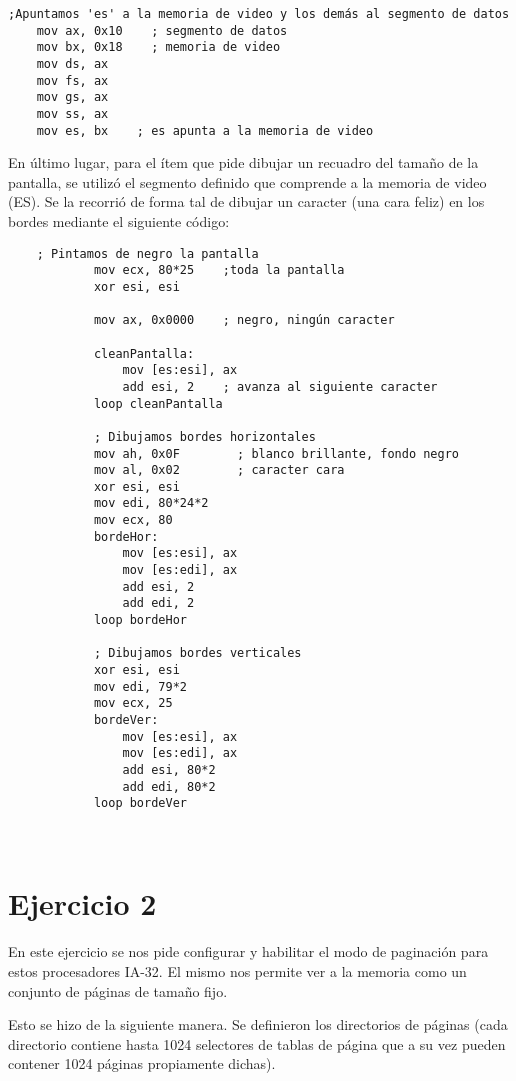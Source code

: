 \begin{verbatim}
;Apuntamos 'es' a la memoria de video y los demás al segmento de datos
	mov ax, 0x10    ; segmento de datos
	mov bx, 0x18    ; memoria de video
	mov ds, ax
	mov fs, ax
	mov gs, ax
	mov ss, ax
	mov es, bx    ; es apunta a la memoria de video

\end{verbatim}

En último lugar, para el ítem que pide dibujar un recuadro del tamaño de la pantalla, se utilizó el segmento definido que comprende a la memoria de video (ES). Se la recorrió de forma tal de dibujar un caracter (una cara feliz) en los bordes mediante el siguiente código:

\begin{verbatim}
    ; Pintamos de negro la pantalla
            mov ecx, 80*25    ;toda la pantalla
            xor esi, esi

            mov ax, 0x0000    ; negro, ningún caracter

            cleanPantalla:
                mov [es:esi], ax
                add esi, 2    ; avanza al siguiente caracter
            loop cleanPantalla

            ; Dibujamos bordes horizontales
            mov ah, 0x0F        ; blanco brillante, fondo negro
            mov al, 0x02        ; caracter cara
            xor esi, esi
            mov edi, 80*24*2
            mov ecx, 80
            bordeHor:
                mov [es:esi], ax
                mov [es:edi], ax
                add esi, 2
                add edi, 2
            loop bordeHor

            ; Dibujamos bordes verticales
            xor esi, esi
            mov edi, 79*2
            mov ecx, 25
            bordeVer:
                mov [es:esi], ax
                mov [es:edi], ax
                add esi, 80*2
                add edi, 80*2
            loop bordeVer

 
\end{verbatim}

\section{Ejercicio 2}

En este ejercicio se nos pide configurar y habilitar el modo de paginación para estos procesadores IA-32. El mismo nos permite ver a la memoria como un conjunto de páginas de tamaño fijo. %

Esto se hizo de la siguiente manera. Se definieron los directorios de páginas (cada directorio contiene hasta 1024 selectores de tablas de página que a su vez pueden contener 1024 páginas propiamente dichas). 

